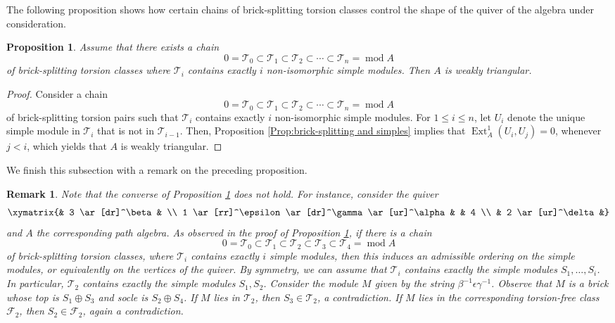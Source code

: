 \documentclass{amsart}
\theoremstyle{thmstyle}
\newtheorem{proposition}[thm]{Proposition}
\theoremstyle{exstyle}
\theoremstyle{defstyle}
\theoremstyle{remstyle}
\newtheorem{remark}[thm]{Remark}
\theoremstyle{remstyle}
\newcommand{\Ext}{\operatorname{Ext}}
\DeclareMathOperator*{\modu}{mod}
\begin{document}
The following proposition shows how certain chains of brick-splitting torsion classes control the shape of the quiver of the algebra under consideration.

\begin{proposition} \label{prop: chain of brick-splitting separating simples}
    Assume that there exists a chain $$0 = \mathcal{T}_0 \subset \mathcal{T}_1 \subset \mathcal{T}_2 \subset \cdots \subset \mathcal{T}_n = \modu A$$
  of brick-splitting torsion classes where $\mathcal{T}_i$ contains exactly $i$ non-isomorphic simple modules. Then $A$ is weakly triangular.
\end{proposition}

\begin{proof}
Consider a chain $$0 = \mathcal{T}_0 \subset \mathcal{T}_1 \subset \mathcal{T}_2 \subset \cdots \subset \mathcal{T}_n = \modu A$$
of brick-splitting torsion pairs such that $\mathcal{T}_i$ contains exactly $i$ non-isomorphic simple modules. 
For $1 \le i \le n$, let $U_i$ denote the unique simple module in $\mathcal{T}_i$ that is not in $\mathcal{T}_{i-1}$. Then, Proposition \ref{Prop:brick-splitting and simples} implies that $\Ext^1_A(U_i, U_j)=0$, whenever $j < i$, which yields that $A$ is weakly triangular.
\end{proof}

We finish this subsection with a remark on the preceding proposition.

\begin{remark}
    
Note that the converse of Proposition \ref{prop: chain of brick-splitting separating simples} does not hold. For instance, consider the quiver
$$\xymatrix{& 3 \ar[dr]^\beta & \\
1 \ar[rr]^\epsilon \ar[dr]^\gamma \ar[ur]^\alpha & & 4 \\
& 2 \ar[ur]^\delta&}$$
and $A$ the corresponding path algebra. 
As observed in the proof of Proposition \ref{prop: chain of brick-splitting separating simples}, if there is a chain $$0 = \mathcal{T}_0 \subset \mathcal{T}_1 \subset \mathcal{T}_2 \subset \mathcal{T}_3 \subset \mathcal{T}_4 = \modu A$$ of brick-splitting torsion classes, where $\mathcal{T}_i$ contains exactly $i$ simple modules, then this induces an admissible ordering on the simple modules, or equivalently on the vertices of the quiver. By symmetry, we can assume that $\mathcal{T}_i$ contains exactly the simple modules $S_1, \ldots, S_i$. In particular, $\mathcal{T}_2$ contains exactly the simple modules $S_1, S_2$. 
Consider the module $M$ given by the string $\beta^{-1}\epsilon\gamma^{-1}$. Observe that $M$ is a brick whose top is $S_1 \oplus S_3$ and socle is $S_2 \oplus S_4$. If $M$ lies in $\mathcal{T}_2$, then $S_3 \in \mathcal{T}_2$, a contradiction. If $M$ lies in the corresponding torsion-free class $\mathcal{F}_2$, then $S_2 \in \mathcal{F}_2$, again a contradiction. 
\end{remark}
\end{document}
